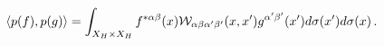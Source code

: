\begin{equation}
\langle p(f),p(g)\rangle=\int_{X_{H}\times X_{H}}
f^{*\alpha\beta}(x){\cal W}_{\alpha\beta\alpha'\beta'}(x,x')
g^{\alpha'\beta'}(x')d\sigma(x')d\sigma(x)\,.
\end{equation}

